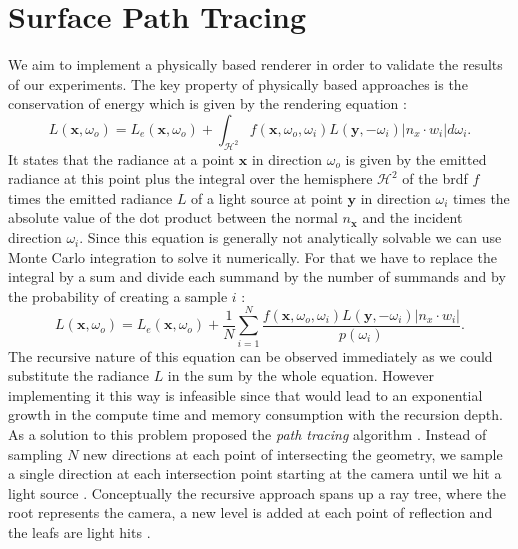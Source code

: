 \section{Surface Path Tracing}
We aim to implement a physically based renderer in order to validate the results of our experiments.
The key property of physically based approaches is the conservation of energy which is given by the rendering equation \cite{rendering_equation}:
\begin{equation}
    \label{eq:render_equation}
    L(\boldsymbol{x}, \omega_o) = L_e(\boldsymbol{x}, \omega_o) + \int_{\mathcal{H}^2} f(\boldsymbol{x}, \omega_o, \omega_i) L(\boldsymbol{y}, -\omega_i) |n_x \cdot w_i| d\omega_i.
\end{equation}
It states that the radiance at a point $\boldsymbol{x}$ in direction $\omega_o$ is given by the emitted radiance at this point plus the integral over the hemisphere $\mathcal{H}^2$ of the \ac{brdf} $f$ times the emitted radiance $L$ of a light source at point $\boldsymbol{y}$ in direction $\omega_i$ times the absolute value of the dot product between the normal $n_\textbf{x}$ and the incident direction $\omega_i$.
Since this equation is generally not analytically solvable we can use Monte Carlo integration to solve it numerically.
For that we have to replace the integral by a sum and divide each summand by the number of summands and by the probability of creating a sample $i$ \cite{pbr}:
\begin{equation*}
    L(\boldsymbol{x}, \omega_o) = L_e(\boldsymbol{x}, \omega_o) + \frac{1}{N}\sum_{i=1}^{N} \frac{f(\boldsymbol{x}, \omega_o, \omega_i) L(\boldsymbol{y}, -\omega_i) |n_x \cdot w_i|}{p(\omega_i)}.
\end{equation*}
The recursive nature of this equation can be observed immediately as we could substitute the radiance $L$ in the sum by the whole equation.
However implementing it this way is infeasible since that would lead to an exponential growth in the compute time and memory consumption with the recursion depth.
As a solution to this problem \citeauthor{rendering_equation} proposed the \textit{path tracing} algorithm \cite{rendering_equation}.
Instead of sampling $N$ new directions at each point of intersecting the geometry, we sample a single direction at each intersection point starting at the camera until we hit a light source \cite{rendering_equation}.
Conceptually the recursive approach spans up a ray tree, where the root represents the camera, a new level is added at each point of reflection and the leafs are light hits \cite{rendering_equation}.
